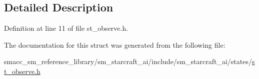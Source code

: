 \subsection{Detailed Description}


Definition at line 11 of file st\+\_\+observe.\+h.



The documentation for this struct was generated from the following file\+:\begin{DoxyCompactItemize}
\item 
smacc\+\_\+sm\+\_\+reference\+\_\+library/sm\+\_\+starcraft\+\_\+ai/include/sm\+\_\+starcraft\+\_\+ai/states/\hyperlink{sm__starcraft__ai_2include_2sm__starcraft__ai_2states_2st__observe_8h}{st\+\_\+observe.\+h}\end{DoxyCompactItemize}
